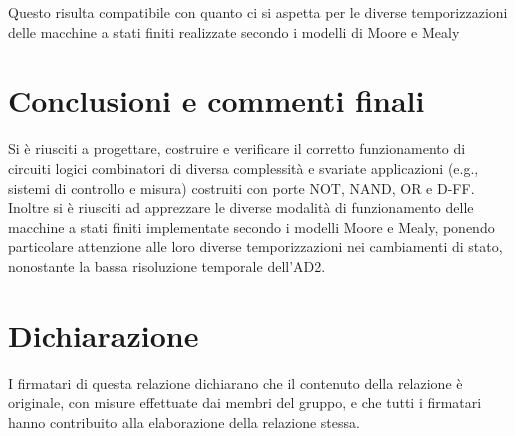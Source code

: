 \documentclass[10pt, a4paper, italian]{article}
\begin{document}
Questo risulta compatibile con quanto ci si aspetta per le diverse
temporizzazioni delle macchine a stati finiti realizzate secondo i modelli di
Moore e Mealy

\section*{Conclusioni e commenti finali}
Si è riusciti a progettare, costruire e verificare il corretto funzionamento
di circuiti logici combinatori di diversa complessità e svariate applicazioni
(e.g., sistemi di controllo e misura) costruiti con porte NOT, NAND, OR e D-FF.
Inoltre si è riusciti ad apprezzare le diverse modalità di funzionamento delle
macchine a stati finiti implementate secondo i modelli Moore e Mealy, ponendo
particolare attenzione alle loro diverse temporizzazioni nei cambiamenti di
stato, nonostante la bassa risoluzione temporale dell'AD2.

\section*{Dichiarazione}
I firmatari di questa relazione dichiarano che il contenuto della relazione \`e
originale, con misure effettuate dai membri del gruppo, e che tutti i firmatari
hanno contribuito alla elaborazione della relazione stessa.
\end{document}

